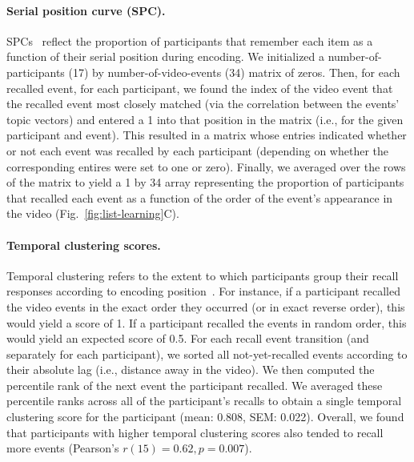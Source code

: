 \documentclass{article}
\begin{document}
\paragraph{Serial position curve (SPC).} SPCs~\citep{Murd62a} reflect the proportion of participants that remember each item as a function of their serial position during encoding. We initialized a number-of-participants (17) by number-of-video-events (34) matrix of zeros. Then, for each recalled event, for each participant, we found the index of the video event that the recalled event most closely matched (via the correlation between the events' topic vectors) and entered a 1 into that position in the matrix (i.e., for the given participant and event). This resulted in a matrix whose entries indicated whether or not each event was recalled by each participant (depending on whether the corresponding entires were set to one or zero).  Finally, we averaged over the rows of the matrix to yield a 1 by 34 array representing the proportion of participants that recalled each event as a function of the order of the event's appearance in the video (Fig.~\ref{fig:list-learning}C).

\paragraph{Temporal clustering scores.} Temporal clustering refers to the extent to which participants group their recall responses according to encoding position~\citep{PolyEtal09}. For instance, if a participant recalled the video events in the exact order they occurred (or in exact reverse order), this would yield a score of 1.  If a participant recalled the events in random order, this would yield an expected score of 0.5.  For each recall event transition (and separately for each participant), we sorted all not-yet-recalled events according to their absolute lag (i.e., distance away in the video).  We then computed the percentile rank of the next event the participant recalled.  We averaged these percentile ranks across all of the participant's recalls to obtain a single temporal clustering score for the participant (mean: 0.808, SEM: 0.022).  Overall, we found that participants with higher temporal clustering scores also tended to recall more events (Pearson's $r(15) = 0.62, p = 0.007$).
\end{document}

